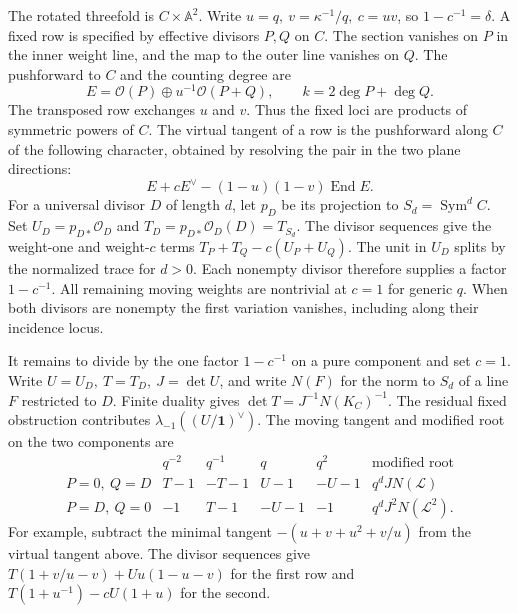 The rotated threefold is \(C\times\mathbb A^2\). Write
\(u=q,\ v=\kappa^{-1}/q,\ c=uv\), so \(1-c^{-1}=\delta\).
A fixed row is specified by effective divisors \(P,Q\) on \(C\).
The section vanishes on \(P\) in the inner weight line, and the
map to the outer line vanishes on \(Q\). The pushforward to \(C\) and
the counting degree are
\[
 E=\mathcal O(P)\oplus u^{-1}\mathcal O(P+Q),
 \qquad k=2\deg P+\deg Q .
\]
The transposed row exchanges \(u\) and \(v\). Thus the fixed loci are
products of symmetric powers of \(C\). The virtual tangent of a row
is the pushforward along \(C\) of the following character, obtained
by resolving the pair in the two plane directions:
\[
 E+c E^\vee-(1-u)(1-v)\operatorname{End}E .
\]
For a universal divisor \(D\) of length \(d\), let \(p_D\) be its
projection to \(S_d=\operatorname{Sym}^d C\). Set
\(U_D=p_{D*}\mathcal O_D\) and
\(T_D=p_{D*}\mathcal O_D(D)=T_{S_d}\). The divisor sequences give
the weight-one and weight-\(c\) terms
\(T_P+T_Q-c(U_P+U_Q)\). The unit in \(U_D\) splits by the normalized
trace for \(d>0\). Each nonempty divisor therefore supplies a factor
\(1-c^{-1}\). All remaining moving weights are nontrivial at \(c=1\)
for generic \(q\). When both divisors are nonempty the first
variation vanishes, including along their incidence locus.

It remains to divide by the one factor \(1-c^{-1}\) on a pure
component and set \(c=1\). Write \(U=U_D,\ T=T_D,\ J=\det U\), and
write \(N(F)\) for the norm to \(S_d\) of a line \(F\) restricted
to \(D\). Finite duality gives
\(\det T=J^{-1}N(K_C)^{-1}\). The residual fixed obstruction
contributes \(\lambda_{-1}((U/\mathbf1)^\vee)\).
The moving tangent and modified root on the two components are
\begin{equation}
\begin{array}{c|rrrr|l}
 &q^{-2}&q^{-1}&q&q^2&\text{modified root}\\ \hline
 P=0,\ Q=D&T-1&-T-1&U-1&-U-1&q^d J N(\mathcal L)\\
 P=D,\ Q=0&-1&T-1&-U-1&-1&q^d J^2 N(\mathcal L^2).
\end{array}
\label{eq:circle-pure-moving}
\end{equation}
For example, subtract the minimal tangent
\(-(u+v+u^2+v/u)\) from the virtual tangent above. The divisor
sequences give \(T(1+v/u-v)+Uu(1-u-v)\) for the first row and
\(T(1+u^{-1})-cU(1+u)\) for the second.

